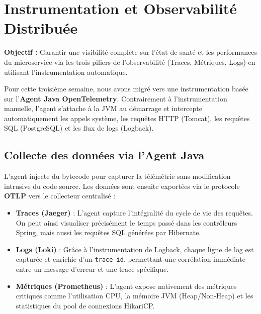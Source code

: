 \documentclass[12pt,a4paper]{article}
\begin{document}
\newpage
\section{Instrumentation et Observabilité Distribuée}

\begin{infobox}
\textbf{Objectif :} Garantir une visibilité complète sur l'état de santé et les performances du microservice via les trois piliers de l'observabilité (Traces, Métriques, Logs) en utilisant l'instrumentation automatique.
\end{infobox}

\vspace{0.5cm}

Pour cette troisième semaine, nous avons migré vers une instrumentation basée sur l'\textbf{Agent Java OpenTelemetry}. Contrairement à l'instrumentation manuelle, l'agent s'attache à la JVM au démarrage et intercepte automatiquement les appels système, les requêtes HTTP (Tomcat), les requêtes SQL (PostgreSQL) et les flux de logs (Logback).

\subsection{Collecte des données via l'Agent Java}

L'agent injecte du bytecode pour capturer la télémétrie sans modification intrusive du code source. Les données sont ensuite exportées via le protocole \textbf{OTLP} vers le collecteur centralisé :

\begin{itemize}
    \item \textbf{Traces (Jaeger)} : L'agent capture l'intégralité du cycle de vie des requêtes. On peut ainsi visualiser précisément le temps passé dans les contrôleurs Spring, mais aussi les requêtes SQL générées par Hibernate.
    \item \textbf{Logs (Loki)} : Grâce à l'instrumentation de Logback, chaque ligne de log est capturée et enrichie d'un \texttt{trace\_id}, permettant une corrélation immédiate entre un message d'erreur et une trace spécifique.
    \item \textbf{Métriques (Prometheus)} : L'agent expose nativement des métriques critiques comme l'utilisation CPU, la mémoire JVM (Heap/Non-Heap) et les statistiques du pool de connexions HikariCP.
\end{itemize}
\end{document}
